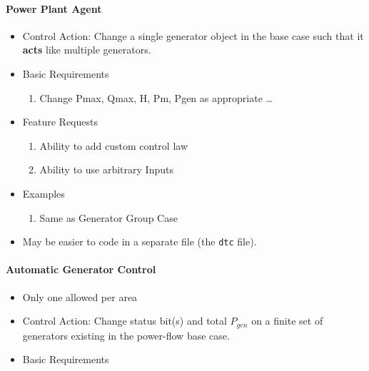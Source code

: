 \documentclass[12pt]{article}
\begin{document}
\begin{multicols*}{2}
\raggedright

\paragraph{Power Plant Agent}
\begin{itemize}
	\item Control Action: Change a single generator object in the base case such that it \textbf{acts} like multiple generators.
	\item Basic Requirements
	\begin{enumerate}
		\item Change Pmax, Qmax, H, Pm, Pgen as appropriate \ldots
	\end{enumerate}
	\item Feature Requests
	\begin{enumerate}
		\item Ability to add custom control law
		\item Ability to use arbitrary Inputs
	\end{enumerate}
	\item Examples
	\begin{enumerate}
	\item Same as Generator Group Case
	\end{enumerate}	
	\item May be easier to code in a separate file (the \verb|dtc| file).

\end{itemize}
	
\vfill\null
\columnbreak

\paragraph{Automatic Generator Control}
\begin{itemize}
	\item Only one allowed per area
	\item Control Action: Change status bit(s) and total $P_{gen}$ on a finite set of generators existing in the power-flow base case.
	\item Basic Requirements


\end{itemize}
\end{multicols*}
\end{document}

